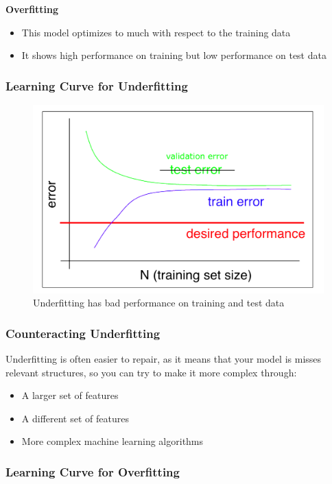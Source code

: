 \documentclass[11pt]{article}
\begin{document}
\noindent
\textbf{Overfitting}
\begin{itemize}
    \item This model optimizes to much with respect to the training data
    \item It shows high performance on training but low performance on test data
\end{itemize}

\clearpage

\subsubsection{Learning Curve for Underfitting}
     
\begin{figure}[h!]
    \centering
    \includegraphics[width=0.7\linewidth, keepaspectratio]{Pictures/underfitting_learning_curve}
    \caption{Underfitting has bad performance on training and test data}
    \label{fig:underfittinglearningcurve}
\end{figure}

\subsubsection{Counteracting Underfitting}
Underfitting is often easier to repair, as it means that your model is misses relevant structures, so you can try to make it more complex through:
\begin{itemize}
    \item A larger set of features
    \item A different set of features
    \item More complex machine learning algorithms
\end{itemize}

\subsubsection{Learning Curve for Overfitting}
\end{document}
